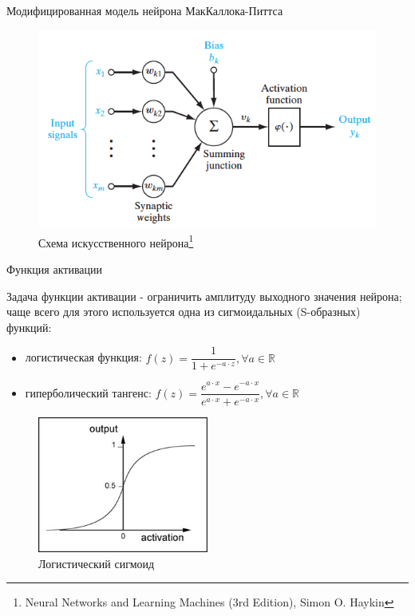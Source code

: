 \documentclass[10pt]{beamer}
\begin{document}
\begin{frame}{Модифицированная модель нейрона МакКаллока-Питтса}

\begin{figure}[h!]
  \centering
  \includegraphics[width=1\textwidth]{images/neuron_mod.png}
  \caption{Схема искусственного нейрона\footnote{Neural Networks and Learning Machines (3rd Edition), Simon O. Haykin}}
\end{figure}

\end{frame}


\begin{frame}{Функция активации}

Задача функции активации - ограничить амплитуду выходного значения нейрона; чаще всего для этого используется одна из сигмоидальных (S-образных) функций:
\begin{itemize}
	\item логистическая функция: $f(z) = \dfrac{1}{1 + e^{-a\cdot z}}, \forall a \in \mathbb{R}$
	\item гиперболический тангенс: $f(z) = \dfrac{e^{a\cdot x} - e^{-a\cdot x}}{e^{a\cdot x} + e^{-a\cdot x}}, \forall a \in \mathbb{R}$
\end{itemize}

\begin{figure}[h!]
  \centering
  \includegraphics[width=0.5\textwidth]{images/sigmoid.jpg}
  \caption{Логистический сигмоид}
\end{figure}

\end{frame}
\end{document}
